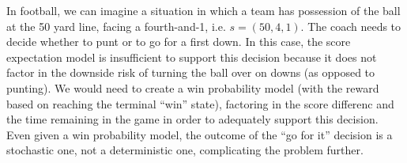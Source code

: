 \documentclass{article}
\begin{document}
      In football, we can imagine a situation in which a team has possession of the ball at the 50 yard line, facing a fourth-and-1, i.e. $s = (50, 4, 1)$. The coach needs to decide whether to punt or to go for a first down. In this case, the score expectation model is insufficient to support this decision because it does not factor in the downside risk of turning the ball over on downs (as opposed to punting). We would need to create a win probability model (with the reward based on reaching the terminal ``win'' state), factoring in the score differenc and the time remaining in the game in order to adequately support this decision. Even given a win probability model, the outcome of the ``go for it'' decision is a stochastic one, not a deterministic one, complicating the problem further.
\end{document}
